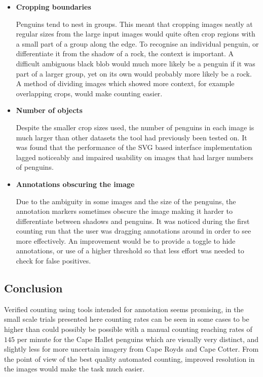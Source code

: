 \begin{itemize}
    \item {\textbf{Cropping boundaries}}\par
Penguins tend to nest in groups. This meant that cropping images neatly at regular sizes from the large input images would quite often crop regions with a small part of a group along the edge. To recognise an individual penguin, or differentiate it from the shadow of a rock, the context is important. A difficult ambiguous black blob would much more likely be a penguin if it was part of a larger group, yet on its own would probably more likely be a rock. A method of dividing images which showed more context, for example overlapping crops, would make counting easier.
    \item {\textbf{Number of objects}}\par
Despite the smaller crop sizes used, the number of penguins in each image is much larger than other datasets the tool had previously been tested on. It was found that the performance of the \gls{SVG} based interface implementation lagged noticeably and impaired usability on images that had larger numbers of penguins. 
    \item {\textbf{Annotations obscuring the image}}\par
Due to the ambiguity in some images and the size of the penguins,  the annotation markers sometimes obscure the image making it harder to differentiate between shadows and penguins. It was noticed during the first counting run that the user was dragging annotations around in order to see more effectively. An improvement would be to provide a toggle to hide annotations, or use of a higher threshold so that less effort was needed to check for false positives.

\end{itemize}


\subsection{Conclusion}
\label{sec:penguin_conclusion}

Verified counting using tools intended for annotation seems promising, in the small scale trials presented here counting rates can be seen in some cases to be higher than could possibly be possible with a manual counting reaching rates of $145$ per minute for the Cape Hallet penguins which are visually very distinct, and slightly less for more uncertain imagery from Cape Royds and Cape Cotter. From the point of view of the best quality automated counting, improved resolution in the images would make the task much easier. 

